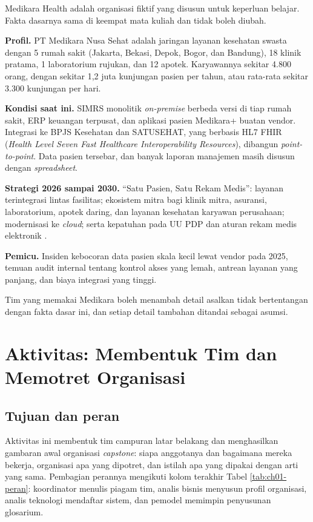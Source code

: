 \begin{kasus}[title={Kasus Medikara Health: Profil Organisasi Fiktif}]
  Medikara Health adalah organisasi fiktif yang disusun untuk keperluan
  belajar. Fakta dasarnya sama di keempat mata kuliah dan tidak boleh diubah.

  \textbf{Profil.} PT Medikara Nusa Sehat adalah jaringan layanan kesehatan
  swasta dengan 5 rumah sakit (Jakarta, Bekasi, Depok, Bogor, dan Bandung), 18
  klinik pratama, 1 laboratorium rujukan, dan 12 apotek. Karyawannya sekitar
  4.800 orang, dengan sekitar 1,2 juta kunjungan pasien per tahun, atau
  rata-rata sekitar 3.300 kunjungan per hari.

  \textbf{Kondisi saat ini.} SIMRS monolitik \textit{on-premise} berbeda versi
  di tiap rumah sakit, ERP keuangan terpusat, dan aplikasi pasien Medikara+
  buatan vendor. Integrasi ke BPJS Kesehatan dan SATUSEHAT, yang berbasis HL7
  FHIR (\textit{Health Level Seven Fast Healthcare Interoperability
  Resources}), dibangun \textit{point-to-point}. Data pasien tersebar, dan
  banyak laporan manajemen masih disusun dengan \textit{spreadsheet}.

  \textbf{Strategi 2026 sampai 2030.} ``Satu Pasien, Satu Rekam Medis'':
  layanan terintegrasi lintas fasilitas; ekosistem mitra bagi klinik mitra,
  asuransi, laboratorium, apotek daring, dan layanan kesehatan karyawan
  perusahaan; modernisasi ke \textit{cloud}; serta kepatuhan pada UU PDP dan
  aturan rekam medis elektronik \cite{permenkes24-2022}.

  \textbf{Pemicu.} Insiden kebocoran data pasien skala kecil lewat vendor pada
  2025, temuan audit internal tentang kontrol akses yang lemah, antrean layanan
  yang panjang, dan biaya integrasi yang tinggi.

  Tim yang memakai Medikara boleh menambah detail asalkan tidak bertentangan
  dengan fakta dasar ini, dan setiap detail tambahan ditandai sebagai asumsi.
\end{kasus}

\section{Aktivitas: Membentuk Tim dan Memotret Organisasi}

\subsection*{Tujuan dan peran}

Aktivitas ini membentuk tim campuran latar belakang dan menghasilkan gambaran
awal organisasi \textit{capstone}: siapa anggotanya dan bagaimana mereka
bekerja, organisasi apa yang dipotret, dan istilah apa yang dipakai dengan
arti yang sama. Pembagian perannya mengikuti kolom terakhir Tabel
\ref{tab:ch01-peran}: koordinator menulis piagam tim, analis bisnis menyusun
profil organisasi, analis teknologi mendaftar sistem, dan pemodel memimpin
penyusunan glosarium.

